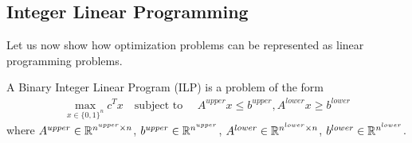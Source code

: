 


\subsection{Integer Linear Programming}

Let us now show how optimization problems can be represented as linear programming problems.



\begin{definition}
	A Binary Integer Linear Program (ILP) is a problem of the form
	\begin{align*}
		\max_{x \in\{0,1\}^n} c^T x \quad \text{subject to } \quad A^{upper} x \leq b^{upper} , A^{lower} x \geq b^{lower} 
	\end{align*}
	where $A^{upper}\in\mathbb{R}^{n^{upper}\times n}$, $b^{upper}\in\mathbb{R}^{n^{upper}}$, $A^{lower}\in\mathbb{R}^{n^{lower}\times n}$, $b^{lower}\in\mathbb{R}^{n^{lower}}$.
\end{definition}



